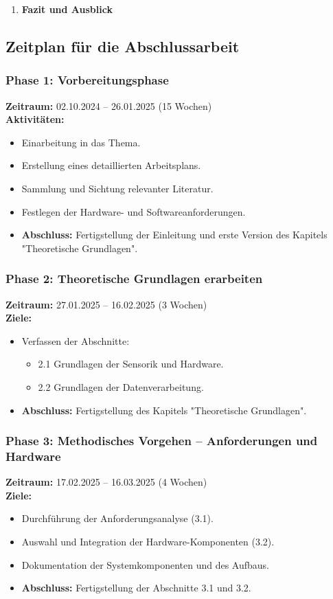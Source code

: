 \documentclass{scrartcl}
\begin{document}
\begin{enumerate}
	\item \textbf{Fazit und Ausblick}
\end{enumerate}

\subsection*{Zeitplan für die Abschlussarbeit}

\subsubsection*{Phase 1: Vorbereitungsphase}
\textbf{Zeitraum:} 02.10.2024 – 26.01.2025 (15 Wochen)  \\
\textbf{Aktivitäten:}
\begin{itemize}
	\item Einarbeitung in das Thema.
	\item Erstellung eines detaillierten Arbeitsplans.
	\item Sammlung und Sichtung relevanter Literatur.
	\item Festlegen der Hardware- und Softwareanforderungen.
	\item \textbf{Abschluss:} Fertigstellung der Einleitung und erste Version des Kapitels "Theoretische Grundlagen".
\end{itemize}

\subsubsection*{Phase 2: Theoretische Grundlagen erarbeiten}
\textbf{Zeitraum:} 27.01.2025 – 16.02.2025 (3 Wochen)  \\
\textbf{Ziele:}
\begin{itemize}
	\item Verfassen der Abschnitte:
	\begin{itemize}
		\item 2.1 Grundlagen der Sensorik und Hardware.
		\item 2.2 Grundlagen der Datenverarbeitung.
	\end{itemize}
	\item \textbf{Abschluss:} Fertigstellung des Kapitels "Theoretische Grundlagen".
\end{itemize}

\subsubsection*{Phase 3: Methodisches Vorgehen – Anforderungen und Hardware}
\textbf{Zeitraum:} 17.02.2025 – 16.03.2025 (4 Wochen)  \\
\textbf{Ziele:}
\begin{itemize}
	\item Durchführung der Anforderungsanalyse (3.1).
	\item Auswahl und Integration der Hardware-Komponenten (3.2).
	\item Dokumentation der Systemkomponenten und des Aufbaus.
	\item \textbf{Abschluss:} Fertigstellung der Abschnitte 3.1 und 3.2.
\end{itemize}
\end{document}
